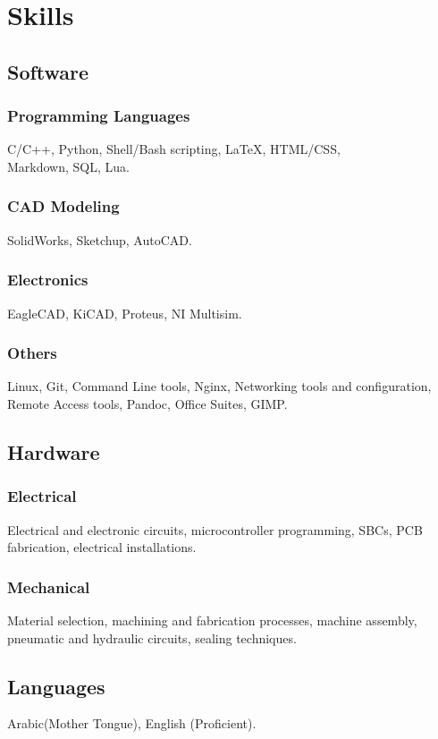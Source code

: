 \documentclass[a4paper]{article}
\begin{document}
	\pagebreak  %

	\section{Skills}
		\subsection{Software}
			\subsubsection{Programming Languages}
			C/C++, Python, Shell/Bash scripting, {\LaTeX}, HTML/CSS, \\Markdown, SQL, Lua.
			\subsubsection{CAD Modeling}	
			SolidWorks, Sketchup, AutoCAD.
			\subsubsection{Electronics}	
			EagleCAD, KiCAD, Proteus, NI Multisim.
			\subsubsection{Others}
			Linux, Git, Command Line tools, Nginx, Networking tools and configuration, \\Remote Access tools, Pandoc, Office Suites, GIMP.
		\subsection{Hardware}
			\subsubsection{Electrical}
			Electrical and electronic circuits, microcontroller programming, SBCs, PCB fabrication, electrical installations.
			\subsubsection{Mechanical}
			Material selection, machining and fabrication processes, machine assembly, pneumatic and hydraulic circuits, sealing techniques.

		\subsection{Languages}
			Arabic(Mother Tongue), English (Proficient).
\end{document}
